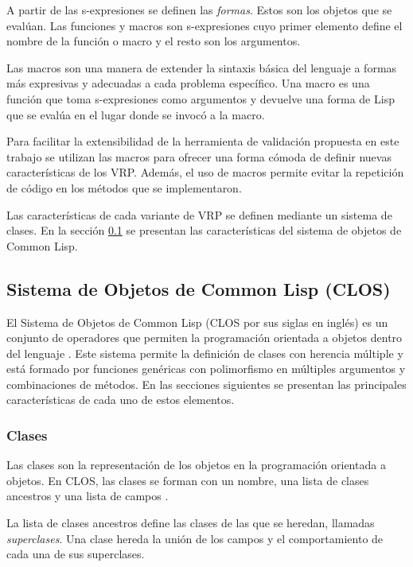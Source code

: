 A partir de las s-expresiones se definen las {\it formas}. Estos son los objetos que se evalúan. Las funciones y macros son s-expresiones cuyo primer elemento define el nombre de la función o macro y el resto son los argumentos.

Las macros son una manera de extender la sintaxis básica del lenguaje a formas más expresivas y adecuadas a cada problema específico. Una macro es una función que toma s-expresiones como argumentos y devuelve una forma de Lisp que se evalúa en el lugar donde se invocó a la macro.

Para facilitar la extensibilidad de la herramienta de validación propuesta en este trabajo se utilizan las macros para ofrecer una forma cómoda de definir nuevas características de los VRP. Además, el uso de macros permite evitar la repetición de código en los métodos que se implementaron.

Las características de cada variante de VRP se definen mediante un sistema de clases. En la sección \ref{subsec:clos} se presentan las características del sistema de objetos de Common Lisp.

\subsection{Sistema de Objetos de Common Lisp (CLOS)}\label{subsec:clos}
El Sistema de Objetos de Common Lisp (CLOS por sus siglas en inglés) es un conjunto de operadores que permiten la programación orientada a objetos dentro del lenguaje \cite{graham@ansiCL}. Este sistema permite la definición de clases con herencia múltiple y está formado por funciones genéricas con polimorfismo en múltiples argumentos y combinaciones de métodos. En las secciones siguientes se presentan las principales características de cada uno de estos elementos.

\subsubsection{Clases}

Las clases son la representación de los objetos en la programación orientada a objetos. En CLOS, las clases se forman con un nombre, una lista de clases ancestros y una lista de campos \cite{graham@ansiCL}. 

La lista de clases ancestros define las clases de las que se heredan, llamadas {\it superclases}. Una clase hereda la unión de los campos y el comportamiento de cada una de sus superclases.

